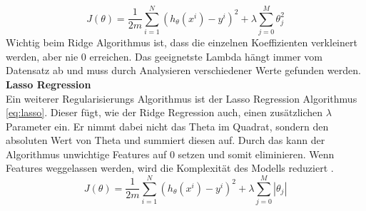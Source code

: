 %
\begin{equation}
\label{eq:ridge}
J(\theta) = \frac{1}{2m} \sum_{i=1}^{N} (h_\theta(x^i) - y^i)^2 + \lambda \sum_{j=0}^{M} \theta_{j}^{2}
\end{equation}
%
\newline
Wichtig beim Ridge Algorithmus ist, dass die einzelnen Koeffizienten verkleinert werden, aber nie 0 erreichen. Das geeignetste Lambda hängt immer vom Datensatz ab und muss durch Analysieren verschiedener Werte gefunden werden.\\[2ex]
%
\textbf{Lasso Regression}\\
Ein weiterer Regularisierungs Algorithmus ist der Lasso Regression Algorithmus \eqref{eq:lasso}. Dieser fügt, wie der Ridge Regression auch, einen zusätzlichen $\lambda$ Parameter ein. Er nimmt dabei nicht das Theta im Quadrat, sondern den absoluten Wert von Theta und summiert diesen auf. Durch das kann der Algorithmus unwichtige Features auf 0 setzen und somit eliminieren. Wenn Features weggelassen werden, wird die Komplexität des Modells reduziert \cite{lasso}. 
%
\begin{equation}
\label{eq:lasso}
J(\theta) = \frac{1}{2m} \sum_{i=1}^{N} (h_\theta(x^i) - y^i)^2 + \lambda \sum_{j=0}^{M} |\theta_j|
\end{equation}
%
%
